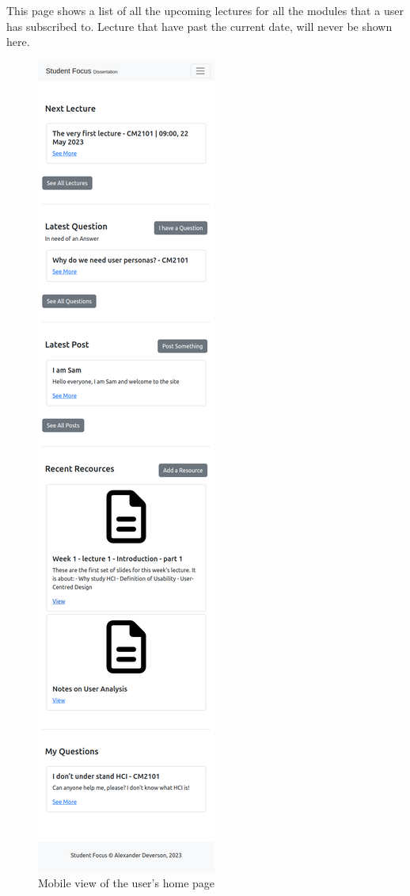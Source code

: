 This page shows a list of all the upcoming lectures for all the modules that a user has subscribed to. Lecture that have past the current date, will never be shown here.

\begin{figure}[H]
\centering
\includegraphics[scale=0.25]{images/application/44 - mobile_home.png}
\caption{Mobile view of the user's home page}
\label{fig:figure2}
\end{figure}

